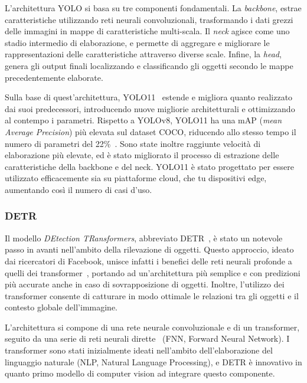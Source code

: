 \documentclass[12pt]{report}
\begin{document}
L'architettura YOLO si basa su tre componenti fondamentali. La \textit{backbone}, estrae caratteristiche utilizzando reti neurali convoluzionali, trasformando i dati grezzi delle immagini in mappe di caratteristiche multi-scala. Il \textit{neck} agisce come uno stadio intermedio di elaborazione, e permette di aggregare e migliorare le rappresentazioni delle caratteristiche attraverso diverse scale. Infine, la \textit{head}, genera gli output finali localizzando e classificando gli oggetti secondo le mappe precedentemente elaborate.

Sulla base di quest'architettura, YOLO11~\cite{yolo11_ultralytics} estende e migliora quanto realizzato dai suoi predecessori, introducendo nuove migliorie architetturali e ottimizzando al contempo i parametri. Rispetto a YOLOv8, YOLO11 ha una mAP (\textit{mean Average Precision}) più elevata sul dataset COCO, riducendo allo stesso tempo il numero di parametri del 22\%~\cite{khanam2024yolov11overviewkeyarchitectural}. Sono state inoltre raggiunte velocità di elaborazione più elevate, ed è stato migliorato il processo di estrazione delle caratteristiche della backbone e del neck. YOLO11 è stato progettato per essere utilizzato efficacemente sia su piattaforme cloud, che tu dispositivi edge, aumentando così il numero di casi d'uso.

\subsubsection{DETR}

Il modello \textit{DEtection TRansformers}, abbreviato DETR~\cite{carion2020end}, è stato un notevole passo in avanti nell'ambito della rilevazione di oggetti. Questo approccio, ideato dai ricercatori di Facebook, unisce infatti i benefici delle reti neurali profonde a quelli dei transformer~\cite{10.1145/3505244}, portando ad un'architettura più semplice e con predizioni più accurate anche in caso di sovrapposizione di oggetti. Inoltre, l'utilizzo dei transformer consente di catturare in modo ottimale le relazioni tra gli oggetti e il contesto globale dell'immagine.

L'architettura si compone di una rete neurale convoluzionale e di un transformer, seguito da una serie di reti neurali dirette~\cite{article_890416} (FNN, Forward Neural Network). I transformer sono stati inizialmente ideati nell'ambito dell'elaborazione del linguaggio naturale (NLP, Natural Language Processing), e DETR è innovativo in quanto primo modello di computer vision ad integrare questo componente.
\end{document}

